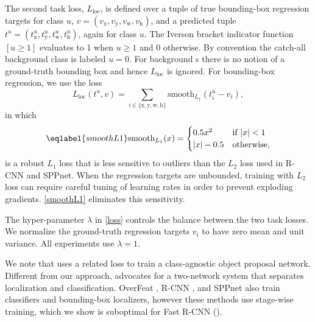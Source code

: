 The second task loss, $L_{\textrm{loc}}$, is defined over a tuple of true bounding-box regression targets for class $u$, $v = (v_\textrm{x}, v_\textrm{y}, v_\textrm{w}, v_\textrm{h})$, and a predicted tuple $t^u = (t^u_\textrm{x}, t^u_\textrm{y}, t^u_\textrm{w}, t^u_\textrm{h})$, again for class $u$.
The Iverson bracket indicator function $[u \ge 1]$ evaluates to 1 when $u \ge 1$ and 0 otherwise.
By convention the catch-all background class is labeled $u = 0$.
For background {\roi}s there is no notion of a ground-truth bounding box and hence $L_\textrm{loc}$ is ignored.
For bounding-box regression, we use the loss
\begin{equation}
L_\textrm{loc}(t^u, v) = \sum_{i \in \{\textrm{x},\textrm{y},\textrm{w},\textrm{h}\}} \textrm{smooth}_{L_1}(t^u_i - v_i),
\end{equation}
in which
\begin{equation}
\eqlabel{smoothL1}
  \textrm{smooth}_{L_1}(x) =
  \begin{cases}
    0.5x^2& \text{if } |x| < 1\\
    |x| - 0.5& \text{otherwise},
  \end{cases}
\end{equation}
is a robust $L_1$ loss that is less sensitive to outliers than the $L_2$ loss used in R-CNN and SPPnet.
When the regression targets are unbounded, training with $L_2$ loss can require careful tuning of learning rates in order to prevent exploding gradients.
\eqref{smoothL1} eliminates this sensitivity.

The hyper-parameter $\lambda$ in \eqref{loss} controls the balance between the two task losses.
We normalize the ground-truth regression targets $v_i$ to have zero mean and unit variance.
All experiments use $\lambda = 1$.

We note that \cite{erhan2014scalable} uses a related loss to train a class-agnostic object proposal network.
Different from our approach, \cite{erhan2014scalable} advocates for a two-network system that separates localization and classification.
OverFeat \cite{overfeat}, R-CNN \cite{girshick2014rcnn}, and SPPnet \cite{he2014spp} also train classifiers and bounding-box localizers, however these methods use stage-wise training, which we show is suboptimal for Fast R-CNN ().

